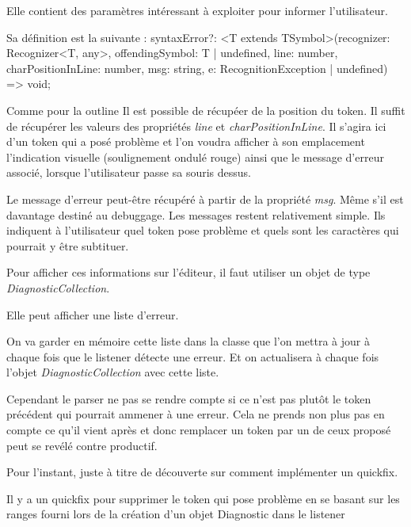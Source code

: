 \documentclass[
    iict, %
    il, %
]{heig-tb}
\begin{document}
Elle contient des paramètres intéressant à exploiter pour informer l'utilisateur.

Sa définition est la suivante :
syntaxError?: <T extends TSymbol>(recognizer: Recognizer<T, any>, offendingSymbol: T | undefined, line: number, charPositionInLine: number, msg: string, e: RecognitionException | undefined) => void;


Comme pour la outline %
Il est possible de récupéer de la position du token. Il suffit de récupérer les valeurs des propriétés \emph{line} et \emph{charPositionInLine}.
Il s'agira ici d'un token qui a posé problème et l'on voudra afficher à son emplacement l'indication visuelle (soulignement ondulé rouge) ainsi que le message d'erreur associé, lorsque l'utilisateur passe
sa souris dessus.

Le message d'erreur peut-être récupéré à partir de la propriété \emph{msg}. Même s'il est davantage destiné au debuggage.
Les messages restent relativement simple. Ils indiquent à l'utilisateur quel token pose problème et quels sont les caractères qui pourrait y être subtituer.

Pour afficher ces informations sur l'éditeur, il faut utiliser un objet de type \emph{DiagnosticCollection}.

Elle peut afficher une liste d'erreur.

On va garder en mémoire cette liste dans la classe que l'on mettra à jour à chaque fois que le listener détecte une erreur.
Et on actualisera à chaque fois l'objet \emph{DiagnosticCollection} avec cette liste.

Cependant le parser ne pas se rendre compte si ce n'est pas plutôt le token précédent qui pourrait ammener à une erreur.
Cela ne prends non plus pas en compte ce qu'il vient après et donc remplacer un token par un de ceux proposé peut se revélé contre productif.

Pour l'instant, juste à titre de découverte sur comment implémenter un quickfix. %

Il y a un quickfix pour supprimer le token qui pose problème en se basant sur les ranges fourni lors de la création d'un objet Diagnostic dans le listener %
\end{document}

